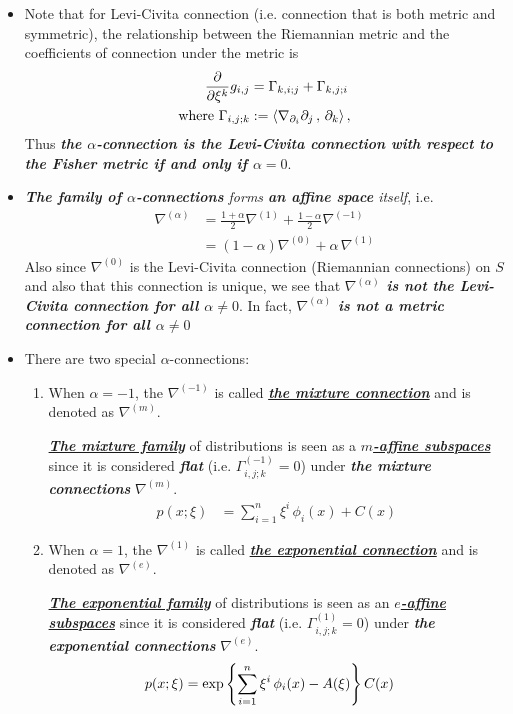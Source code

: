 \documentclass[11pt]{article}
\begin{document}
\begin{itemize}
\item Note that for Levi-Civita connection (i.e. connection that is both metric and symmetric), the relationship between the Riemannian metric and the coefficients of connection under the metric is
\begin{align*}
\frac{\partial }{ \partial \xi^k} g_{i,j} &= \Gamma_{k,i; j} + \Gamma_{k,j; i} \\
\text{where } \Gamma_{i,j; k} &:= \left\langle \nabla_{\partial_i}{\partial_j}\,,\, \partial_k \right\rangle,
\end{align*}
Thus \emph{\textbf{the $\alpha$-connection is the Levi-Civita connection with respect to the Fisher metric if and only if $\alpha = 0$}}.

\item \emph{\textbf{The family of $\alpha$-connections} forms \textbf{an affine space} itself}, i.e. 
\begin{align*}
\nabla^{(\alpha)} &= \frac{1+\alpha}{2}\nabla^{(1)} + \frac{1 - \alpha}{2}\nabla^{(-1)} \\
&= (1-\alpha) \nabla^{(0)} + \alpha\,\nabla^{(1)}
\end{align*} Also since $\nabla^{(0)}$ is the Levi-Civita connection (Riemannian connections) on $S$ and also that this connection is unique, we see that \textbf{\emph{$\nabla^{(\alpha)}$ is not the Levi-Civita connection for all $\alpha \neq 0$}}.  In fact, \textbf{\emph{$\nabla^{(\alpha)}$ is not a metric connection for all $\alpha \neq 0$}}

\item There are two special $\alpha$-connections:
\begin{enumerate}
\item When $\alpha = -1$, the $\nabla^{(-1)}$ is called \underline{\emph{\textbf{the mixture connection}}} and is denoted as $\nabla^{(m)}$.

\underline{\textit{\textbf{The mixture family}}} of distributions is seen as a \underline{\emph{\textbf{$m$-affine subspaces}}} since it is considered \emph{\textbf{flat}} (i.e. $\Gamma^{(-1)}_{i,j;k} =0$) under \emph{\textbf{the mixture connections}} $\nabla^{(m)}$. 
\begin{align}
p(x; \xi) &= \sum_{i=1}^{n}\xi^{i}\,\phi_i(x) + C(x) \label{eqn: mixture_family}
\end{align}


\item When $\alpha = 1$, the $\nabla^{(1)}$ is called \underline{\emph{\textbf{the exponential connection}}} and is denoted as $\nabla^{(e)}$.

\underline{\textit{\textbf{The exponential family}}} of distributions is seen as an \underline{\emph{\textbf{$e$-affine subspaces}}} since it is considered \emph{\textbf{flat}} (i.e. $\Gamma^{(1)}_{i,j;k} =0$) under \emph{\textbf{the exponential connections}} $\nabla^{(e)}$. 
\begin{align}
p(x; \xi) &= \exp\left\{\sum_{i=1}^{n}\xi^{i}\,\phi_i(x) - A(\xi)\right\}C(x) \label{eqn: exponential_family}
\end{align}
\end{enumerate}
\end{itemize}
\end{document}
